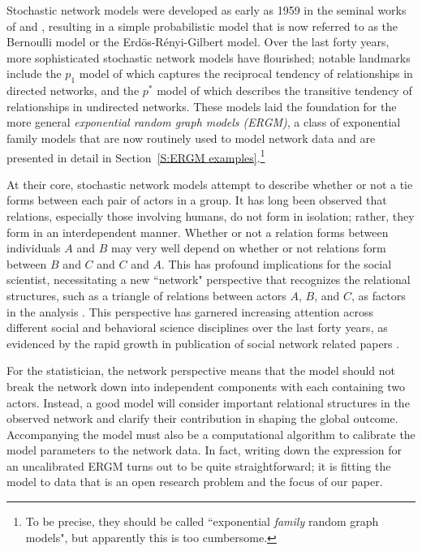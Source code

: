 Stochastic network models were developed as early as 1959 in the seminal works of 
\citet{Gilbert} and \citet{Erdos}, resulting in a simple probabilistic model that is 
now referred to as the Bernoulli model or the Erd\"{o}s-R\'{e}nyi-Gilbert model.  Over 
the last forty years, more sophisticated stochastic network models have flourished;  
notable landmarks include the $p_1$ model of \citet{Holland:1981} which captures the 
reciprocal tendency of relationships in directed networks, and the $p^*$ model of 
\citet{Frank:1986} which describes the transitive tendency of relationships in 
undirected networks.  These models laid the foundation for the more general 
\emph{exponential random graph models (ERGM)}, a class of exponential family 
models that are now routinely used to model network data and are presented in 
detail in Section~\ref{S:ERGM examples}.\footnote{To be precise, they should
be called ``exponential \emph{family} random graph models", but apparently
this is too cumbersome.} 

At their core, stochastic network models attempt to describe whether or not a tie 
forms between each pair of actors in a group.
It has long been observed that relations, especially those involving humans, do not 
form in isolation; rather, they form in an interdependent manner.  Whether or not a 
relation forms between individuals $A$ and $B$ may very well depend on whether or not 
relations form between $B$ and $C$ and $C$ and $A$.  This has profound implications 
for the social scientist, necessitating a new ``network" perspective that recognizes 
the relational structures, such as a triangle of relations between actors $A$, $B$, 
and $C$, as factors in the analysis \citep{Wasserman:1994}.  This perspective has 
garnered increasing attention across different social and behavioral science 
disciplines over the last forty years, as evidenced by the rapid growth in publication 
of social network related papers \citep{Knoke:2008}.
  
For the statistician, the network perspective means that the model should not break the 
network down into independent components with each containing two actors.
Instead, a good model will consider important relational structures in the observed network 
and clarify their contribution in shaping the global outcome.   
Accompanying the model must also be a computational algorithm to calibrate the model 
parameters to the network data.  
In fact, writing down the expression for an uncalibrated ERGM turns out to be quite
straightforward; it is fitting the model
to data that is an open research problem and the focus of our paper.

